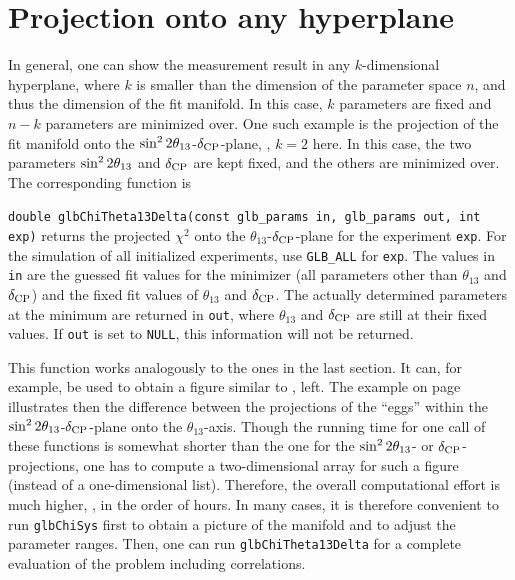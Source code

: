 \section[Projection onto any hyperplane]{Projection onto any hyperplane}

In general, one can show the measurement result in any $k$-dimensional hyperplane, where $k$ is smaller than the dimension of the parameter space $n$, and thus the dimension of the fit manifold. In this case, $k$ parameters are fixed and $n-k$ parameters are minimized over. One such example is the projection of the fit manifold onto the $\sin^2 2 \theta_{13}$-$\delta_{\mathrm{CP}}$-plane, \ie, $k=2$ here. In this case, the two
parameters $\sin^2 2 \theta_{13}$ and $\delta_{\mathrm{CP}}$ are kept fixed, and the others are
minimized over. 
The corresponding function is 
\begin{function}
{\tt double glbChiTheta13Delta(const glb\_params in, glb\_params out, int exp)} returns the projected $\chi^2$ onto the $\theta_{13}$-$\delta_{\mathrm{CP}}$-plane for the  experiment {\tt exp}. For the simulation of all initialized experiments,
use {\tt GLB\_ALL} for {\tt exp}. The values in {\tt in} are the guessed fit values for the minimizer (all parameters other than $\theta_{13}$ and $\delta_{\mathrm{CP}}$) and the fixed fit values of $\theta_{13}$ and $\delta_{\mathrm{CP}}$. The actually determined parameters at the minimum are returned in {\tt out}, where $\theta_{13}$ and $\delta_{\mathrm{CP}}$ are still at their fixed values. If {\tt out} is set to {\tt NULL}, this information will not be returned.
\end{function}
This function works analogously to the ones in the last section. It can, for example, be used to obtain a figure similar to , left.
The example on page~\pageref{ex:corrproj} illustrates then the difference
between the projections of the ``eggs'' within the 
$\sin^2 2 \theta_{13}$-$\delta_{\mathrm{CP}}$-plane onto the $\theta_{13}$-axis. 
Though the running time for one call of these functions is somewhat 
shorter than the one for the $\sin^2 2 \theta_{13}$- or $\delta_{\mathrm{CP}}$-projections, one 
has to compute a two-dimensional array for such a figure (instead of a 
one-dimensional list). Therefore, the overall computational effort is 
much higher, \ie, in the order of hours. In many cases, it is therefore
convenient to run {\tt glbChiSys} first to obtain a picture of
the manifold and to adjust the parameter ranges. Then, one can run
{\tt glbChiTheta13Delta} for a complete evaluation of the problem
including correlations.

